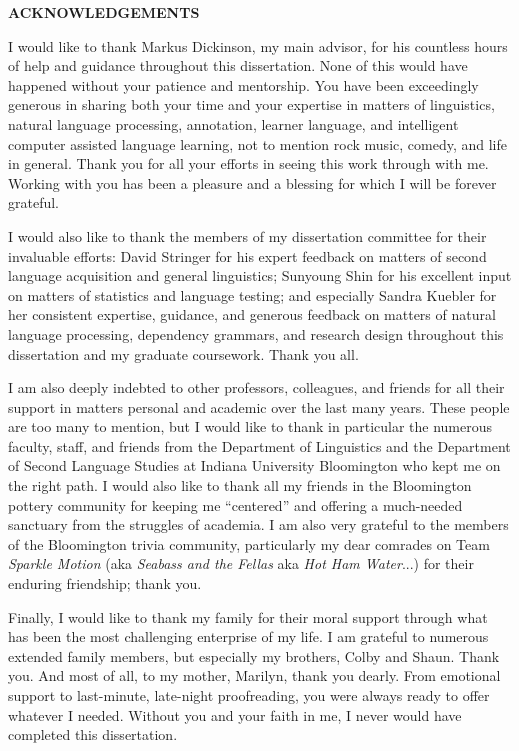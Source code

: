 \begin{centering}
\textbf{ACKNOWLEDGEMENTS}\\
\vspace{\baselineskip}
\end{centering}

I would like to thank Markus Dickinson, my main advisor, for his countless hours of help and guidance throughout this dissertation. None of this would have happened without your patience and mentorship. You have been exceedingly generous in sharing both your time and your expertise in matters of linguistics, natural language processing, annotation, learner language, and intelligent computer assisted language learning, not to mention rock music, comedy, and life in general. Thank you for all your efforts in seeing this work through with me. Working with you has been a pleasure and a blessing for which I will be forever grateful.

I would also like to thank the members of my dissertation committee for their invaluable efforts: David Stringer for his expert feedback on matters of second language acquisition and general linguistics; Sunyoung Shin for his excellent input on matters of statistics and language testing; and especially Sandra Kuebler for her consistent expertise, guidance, and generous feedback on matters of natural language processing, dependency grammars, and research design throughout this dissertation and my graduate coursework. Thank you all.

I am also deeply indebted to other professors, colleagues, and friends for all their support in matters personal and academic over the last many years. These people are too many to mention, but I would like to thank in particular the numerous faculty, staff, and friends from the Department of Linguistics and the Department of Second Language Studies at Indiana University Bloomington who kept me on the right path. I would also like to thank all my friends in the Bloomington pottery community for keeping me ``centered'' and offering a much-needed sanctuary from the struggles of academia. I am also very grateful to the members of the Bloomington trivia community, particularly my dear comrades on Team \textit{Sparkle Motion} (aka \textit{Seabass and the Fellas} aka \textit{Hot Ham Water}...) for their enduring friendship; thank you. 

Finally, I would like to thank my family for their moral support through what has been the most challenging enterprise of my life. I am grateful to numerous extended family members, but especially my brothers, Colby and Shaun. Thank you. And most of all, to my mother, Marilyn, thank you dearly. From emotional support to last-minute, late-night proofreading, you were always ready to offer whatever I needed.  Without you and your faith in me, I never would have completed this dissertation.